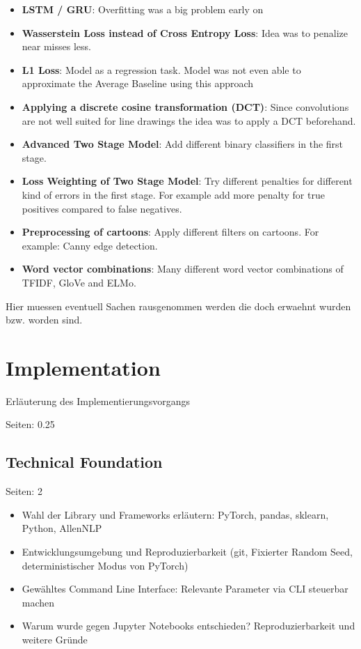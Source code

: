 \documentclass[draft,final,oneside]{vutinfth} %
\begin{document}
\begin{itemize}
\item \textbf{LSTM / GRU}: Overfitting was a big problem early on
\item \textbf{Wasserstein Loss instead of Cross Entropy Loss}: Idea was to penalize near misses less.
\item \textbf{L1 Loss}: Model as a regression task. Model was not even able to approximate the Average Baseline using this approach
\item \textbf{Applying a discrete cosine transformation (DCT)}: Since convolutions are not well suited for line drawings the idea was to apply a DCT beforehand. 
\item \textbf{Advanced Two Stage Model}: Add different binary classifiers in the first stage.
\item \textbf{Loss Weighting of Two Stage Model}: Try different penalties for different kind of errors in the first stage. For example add more penalty for true positives compared to false negatives.
\item \textbf{Preprocessing of cartoons}: Apply different filters on cartoons. For example: Canny edge detection.
\item \textbf{Word vector combinations}: Many different word vector combinations of TFIDF, GloVe and ELMo. 
\end{itemize}

Hier muessen eventuell Sachen rausgenommen werden die doch erwaehnt wurden bzw. worden sind.
\fi

\chapter{Implementation}

Erläuterung des Implementierungsvorgangs

Seiten: 0.25

\section{Technical Foundation}

Seiten: 2

\begin{itemize}

\item Wahl der Library und Frameworks erläutern: PyTorch, pandas, sklearn, Python, AllenNLP
\item Entwicklungsumgebung und Reproduzierbarkeit (git, Fixierter Random Seed, deterministischer Modus von PyTorch)
\item Gewähltes Command Line Interface: Relevante Parameter via CLI steuerbar machen
\item Warum wurde gegen Jupyter Notebooks entschieden? Reproduzierbarkeit und weitere Gründe

\end{itemize}
\end{document}

